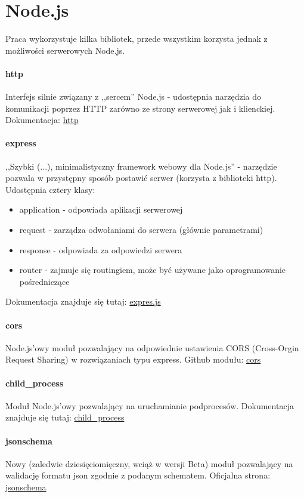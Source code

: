 \section{Node.js}
Praca wykorzystuje kilka bibliotek, przede wszystkim korzysta jednak z możliwości serwerowych Node.js. 
\paragraph{http}
Interfejs silnie związany z ,,sercem'' Node.js - udostępnia narzędzia do komunikacji poprzez HTTP zarówno ze strony serwerowej jak i klienckiej.
\newline Dokumentacja: \href{https://nodejs.org/api/http.html}{http}
\paragraph{express}
,,Szybki (...), minimalistyczny framework webowy dla Node.js'' - narzędzie pozwala w przystępny sposób postawić serwer (korzysta z biblioteki http). Udostępnia cztery klasy:
\begin{itemize}
\item application - odpowiada aplikacji serwerowej
\item  request - zarządza odwołaniami do serwera (głównie parametrami)
\item response - odpowiada za odpowiedzi serwera
\item router - zajmuje się routingiem, może być używane jako oprogramowanie pośredniczące
\end{itemize}
\ind Dokumentacja znajduje się tutaj: \href{https://expressjs.com/}{expres.js}
\paragraph{cors}
Node.js'owy moduł pozwalający na odpowiednie ustawienia CORS (Cross-Orgin Request Sharing) w rozwiązaniach typu express.
\ind Github modułu: \href{https://github.com/expressjs/cors}{cors}
\paragraph{child\_process}
Moduł Node.js'owy pozwalający na uruchamianie podprocesów.
\ind Dokumentacja znajduje się tutaj: \href{https://nodejs.org/api/child_process.html}{child\_process}
\paragraph{jsonschema}
\ind Nowy (zaledwie dziesięciomięczny, wciąż w wersji Beta) moduł pozwalający na walidację formatu json zgodnie z podanym schematem.
\ind Oficjalna strona: \href{https://www.npmjs.com/package/jsonschema}{jsonschema}

